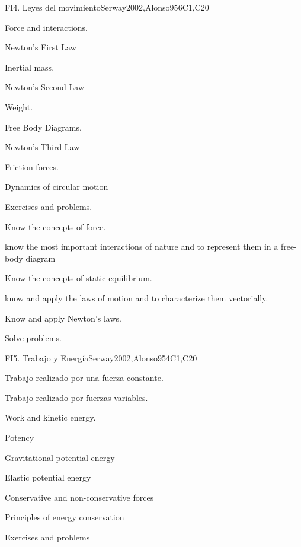 \begin{syllabus}
\begin{unit}{FI4. Leyes del movimiento}{}{Serway2002,Alonso95}{6}{C1,C20}
\begin{topics}
      \item Force and interactions.
      \item Newton's First Law
      \item Inertial mass.
      \item Newton's Second Law
      \item Weight.
      \item Free Body Diagrams.
      \item Newton's Third Law
      \item Friction forces.
      \item Dynamics of circular motion
      \item Exercises and problems.
   \end{topics}

   \begin{learningoutcomes}
      \item Know the concepts of force.
      \item know the most important interactions of nature and to represent them in a free-body diagram
      \item Know the concepts of static equilibrium.
      \item know and apply the laws of motion and to characterize them vectorially.
      \item Know and apply Newton's laws.
      \item Solve problems.
   \end{learningoutcomes}
\end{unit}

\begin{unit}{FI5. Trabajo y Energía}{}{Serway2002,Alonso95}{4}{C1,C20}
\begin{topics}
	\item Trabajo realizado por una fuerza constante.
	\item Trabajo realizado por fuerzas variables.
	\item Work and kinetic energy.
	\item Potency
	\item Gravitational potential energy
	\item Elastic potential energy
	\item Conservative and non-conservative forces
	\item Principles of energy conservation
	\item Exercises and problems
\end{topics}


\end{unit}
\end{syllabus}
